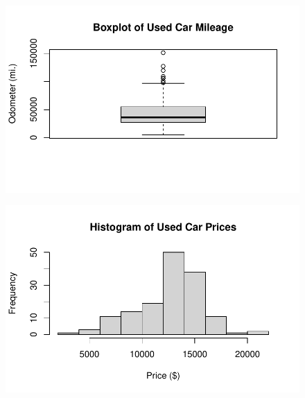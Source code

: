 \documentclass[
  letterpaper,
  DIV=11,
  numbers=noendperiod]{scrartcl}
\newenvironment{Shaded}{\begin{snugshade}}{\end{snugshade}}
\newcommand{\AttributeTok}[1]{\textcolor[rgb]{0.40,0.45,0.13}{#1}}
\newcommand{\FunctionTok}[1]{\textcolor[rgb]{0.28,0.35,0.67}{#1}}
\newcommand{\NormalTok}[1]{\textcolor[rgb]{0.00,0.23,0.31}{#1}}
\newcommand{\SpecialCharTok}[1]{\textcolor[rgb]{0.37,0.37,0.37}{#1}}
\newcommand{\StringTok}[1]{\textcolor[rgb]{0.13,0.47,0.30}{#1}}
\begin{document}
\begin{figure}[H]

{\centering \includegraphics{Unidad_1_files/figure-pdf/unnamed-chunk-14-2.pdf}

}

\end{figure}

\begin{Shaded}
\end{Shaded}

\begin{figure}[H]

{\centering \includegraphics{Unidad_1_files/figure-pdf/unnamed-chunk-15-1.pdf}

}

\end{figure}
\end{document}
